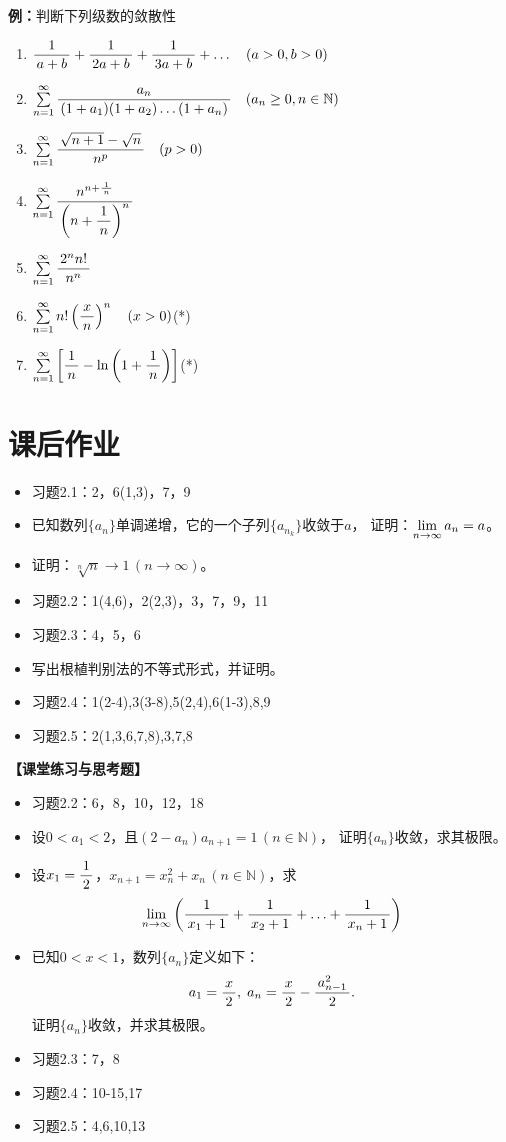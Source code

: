 {\bf 例：}判断下列级数的敛散性
\begin{enumerate}[(1)]
  \setlength{\itemindent}{1cm}
  
  \item $\df 1{a+b}+\df 1{2a+b}+\df 1{3a+b}+\ldots\quad (a>0,b>0)$
  \item $\sumn\df {a_n}{(1+a_1)(1+a_2)\ldots(1+a_n)}\quad(a_n\geq
	  0,n\in\mathbb{N})$
  
  \item $\sumn\df{\sqrt{n+1}-\sqrt{n}}{n^p}\quad(p>0)$
  \item $\sumn\df{n^{n+\frac 1{\,n\,}}}{\left(n+\df 1n\right)^n}$
  \item $\sumn\df{2^nn!}{n^n}$
  \item $\sumn n!\left(\df{x}{n}\right)^n\quad (x>0)$(*)
  \item $\sumn\left[\df 1n-\ln\left(1+\df 1n\right)\right]$(*)
\end{enumerate}

\newpage

\section*{课后作业}

\begin{itemize}
  \item 习题2.1：2，6(1,3)，7，9
  \item 已知数列$\{a_n\}$单调递增，它的一个子列$\{a_{n_k}\}$收敛于$a$，
  证明：$\limn a_n=a$。
  \item 证明：$\sqrt[n]n\to 1\,(n\to\infty)$。
  \item 习题2.2：1(4,6)，2(2,3)，3，7，9，11
  \item 习题2.3：4，5，6
  \item 写出根植判别法的不等式形式，并证明。
  \item 习题2.4：1(2-4),3(3-8),5(2,4),6(1-3),8,9
  \item 习题2.5：2(1,3,6,7,8),3,7,8
\end{itemize}

{\bf 【课堂练习与思考题】}

\begin{itemize}
  \item 习题2.2：6，8，10，12，18
  \item 设$0<a_1<2$，且$(2-a_n)a_{n+1}=1\,(n\in\mathbb{N})$，
  	证明$\{a_n\}$收敛，求其极限。
  \item 设$x_1=\df 12$，$x_{n+1}=x_n^2+x_n\,(n\in\mathbb{N})$，求
	$$\limn\left(\df 1{x_1+1}+\df 1{x_2+1}+\ldots+\df
	1{x_n+1}\right)$$
  \item 已知$0<x<1$，数列$\{a_n\}$定义如下：
	$$a_1=\df x2,\;a_n=\df x2-\df{a_{n-1}^2}2.$$
	证明$\{a_n\}$收敛，并求其极限。
  \item 习题2.3：7，8 
  \item 习题2.4：10-15,17
  \item 习题2.5：4,6,10,13
\end{itemize}